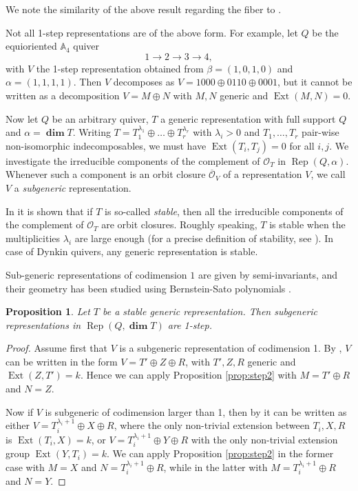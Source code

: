 \documentclass[twoside]{article}
\newcommand{\orb}{\mathcal{O}}
\DeclareMathOperator{\Dim}{\mathbf{dim}}
\newcommand{\Ext}{\operatorname{Ext}}
\newcommand{\Rep}{\operatorname{Rep}}
\newcommand{\A}{\mathbb{A}}
\newtheorem{proposition}[theorem]{Proposition}
\theoremstyle{definition}
\begin{document}
\vspace{0.05in}

We note the similarity of the above result regarding the fiber to \cite[Proposition 3.1]{quivgrass}.

\vspace{0.1in}

Not all 1-step representations are of the above form. For example, let $Q$ be the equioriented $\A_4$ quiver 
$$1\to 2 \to 3 \to 4,$$
with $V$ the 1-step representation obtained from $\beta = (1,0,1,0)$ and $\alpha=(1,1,1,1)$. Then $V$ decomposes as $V=1000\oplus 0110 \oplus 0001$, but it cannot be written as a decomposition $V=M\oplus N$ with $M,N$ generic and $\Ext(M,N)=0$.

\vspace{0.15in}

Now let $Q$ be an arbitrary quiver, $T$ a generic representation with full support $Q$ and $\alpha=\Dim T$. Writing $T=T_1^{\lambda_1}\oplus\dots\oplus T_r^{\lambda_r}$ with $\lambda_i>0$ and $T_1,\dots, T_r$ pair-wise non-isomorphic indecomposables, we must have $\Ext(T_i,T_j)=0$ for all $i,j$. We investigate the irreducible components of the complement of $\orb_T$ in $\Rep(Q,\alpha)$. Whenever such a component is an orbit closure $\overline{\orb}_V$ of a representation $V$, we call $V$ a \textit{subgeneric} representation.

In \cite{open} it is shown that if $T$ is so-called \textit{stable}, then all the irreducible components of the complement of $\orb_T$ are orbit closures. Roughly speaking, $T$ is stable when the multiplicities $\lambda_i$ are large enough (for a precise definition of stability, see \cite{open}). In case of Dynkin quivers, any generic representation is stable.

Sub-generic representations of codimension $1$ are given by semi-invariants, and their geometry has been studied using Bernstein-Sato polynomials \cite{lol,bfun}.

\begin{proposition}\label{prop:step3}
Let $T$ be a stable generic representation. Then subgeneric representations in $\Rep(Q,\Dim T)$ are 1-step.
\end{proposition}

\begin{proof}
Assume first that $V$ is a subgeneric representation of codimension 1. By \cite{open}, $V$ can be written in the form $V=T'\oplus Z \oplus R$, with $T',Z,R$ generic and $\Ext(Z,T')=k$. Hence we can apply Proposition \ref{prop:step2} with $M=T'\oplus R$ and $N=Z$.

Now if $V$ is subgeneric of codimension larger than 1, then by \cite{open} it can be written as either $V=T_i^{\lambda_i+1}\oplus X \oplus R$, where the only non-trivial extension between $T_i,X,R$ is $\Ext(T_i,X)=k$, or $V=T_i^{\lambda_i+1}\oplus Y \oplus R$ with the only non-trivial extension group $\Ext(Y,T_i)=k$. We can apply Proposition \ref{prop:step2} in the former case with $M=X$ and $N=T_i^{\lambda_i+1}\oplus R$, while in the latter with $M=T_i^{\lambda_i+1}\oplus R$ and $N=Y$.
\end{proof}
\end{document}
